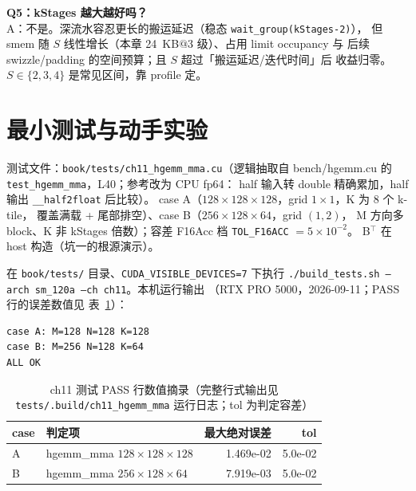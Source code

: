 \textbf{Q5：kStages 越大越好吗？}\\
A：不是。深流水容忍更长的搬运延迟（稳态 \texttt{wait\_\allowbreak{}group\allowbreak{}(k\allowbreak{}Stages-2)}），
但 smem 随 $S$ 线性增长（本章 24~KB$@$3 级）、占用 limit occupancy 与
后续 swizzle/padding 的空间预算；且 $S$ 超过「搬运延迟/迭代时间」后
收益归零。$S\in\{2,3,4\}$ 是常见区间，靠 profile 定。

\section{最小测试与动手实验}

测试文件：\texttt{book/\allowbreak{}tests/\allowbreak{}ch11\_\allowbreak{}hgemm\_\allowbreak{}mma.cu}（逻辑抽取自
bench/hgemm.cu 的 \texttt{test\_\allowbreak{}hgemm\_\allowbreak{}mma}，L40；参考改为 CPU fp64：
half 输入转 double 精确累加，half 输出 \texttt{\_\allowbreak{}\_\allowbreak{}half2float} 后比较）。
case A（$128\times128\times128$，grid $1\times1$，K 为 8 个 k-tile，
覆盖满载 + 尾部排空）、case B（$256\times128\times64$，grid $(1,2)$，
M 方向多 block、K 非 kStages 倍数）；容差 F16Acc 档
\texttt{TOL\_F16ACC} $= 5\times10^{-2}$。
B$^{\top}$ 在 host 构造（坑一的根源演示）。

在 \texttt{book/tests/} 目录、\texttt{CUDA\_\allowbreak{}VISIBLE\_\allowbreak{}DEVICES=\allowbreak{}7} 下执行
\texttt{.\allowbreak{}/\allowbreak{}build\_\allowbreak{}tests.\allowbreak{}sh --arch sm\_\allowbreak{}120a --ch ch11}。本机运行输出
（RTX PRO 5000，2026-09-11；PASS 行的误差数值见
表~\ref{tab:11-pass}）：

\begin{lstlisting}[style=console]
case A: M=128 N=128 K=128
case B: M=256 N=128 K=64
ALL OK
\end{lstlisting}

\begin{table}[htbp]
\centering
\caption{ch11 测试 PASS 行数值摘录（完整行式输出见
\texttt{tests/\allowbreak{}.\allowbreak{}build/\allowbreak{}ch11\_\allowbreak{}hgemm\_\allowbreak{}mma} 运行日志；tol 为判定容差）}
\label{tab:11-pass}
\begin{tabular}{llrr}
\toprule
case & 判定项 & 最大绝对误差 & tol \\
\midrule
A & hgemm\_mma $128\times128\times128$ & 1.469e-02 & 5.0e-02 \\
B & hgemm\_mma $256\times128\times64$  & 7.919e-03 & 5.0e-02 \\
\bottomrule
\end{tabular}
\end{table}

